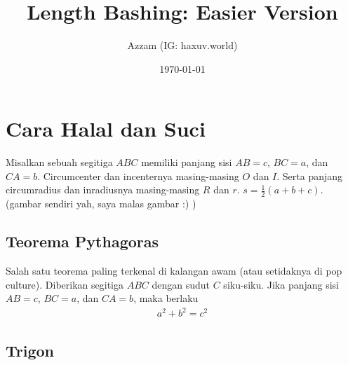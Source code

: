 \documentclass[11pt]{scrartcl}
\title{Length Bashing: Easier Version}
\author{Azzam (IG: haxuv.world)}
\date{\today}
\begin{document}
\maketitle

\renewcommand*\contentsname{Daftar Isi}
\tableofcontents

\newpage

\section{Cara Halal dan Suci}
Misalkan sebuah segitiga $ABC$ memiliki panjang sisi $AB=c$, $BC=a$, dan $CA=b$. Circumcenter dan incenternya masing-masing $O$ dan $I$. Serta panjang circumradius dan inradiusnya masing-masing $R$ dan $r$. $s=\frac{1}{2}(a+b+c)$. (gambar sendiri yah, saya malas gambar :) )

\subsection{Teorema Pythagoras}
Salah satu teorema paling terkenal di kalangan awam (atau setidaknya di pop culture). Diberikan segitiga $ABC$ dengan sudut $C$ siku-siku. Jika panjang sisi $AB=c$, $BC=a$, dan $CA=b$, maka berlaku
\begin{align*}
    a^2+b^2=c^2
\end{align*}
\begin{center}
\end{center}

\subsection{Trigon}
\end{document}

